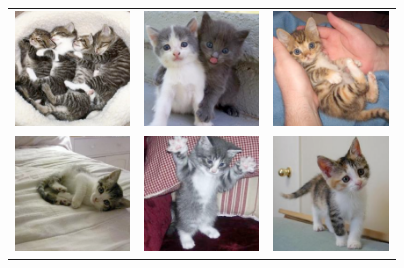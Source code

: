 \documentclass[aspectratio=169]{beamer}
\begin{document}
\begin{frame}
\begin{center}
\begin{tabular}{ccc}
\includegraphics[width=1.2in]{figures/kittenwar_cute_1} & \includegraphics[width=1.2in]{figures/kittenwar_cute_2} & \includegraphics[width=1.2in]{figures/kittenwar_cute_3}\\
\includegraphics[width=1.2in]{figures/kittenwar_cute_4} & \includegraphics[width=1.2in]{figures/kittenwar_cute_5} & \includegraphics[width=1.2in]{figures/kittenwar_cute_6}
\end{tabular}
\end{center}
\end{frame}
\end{document}
